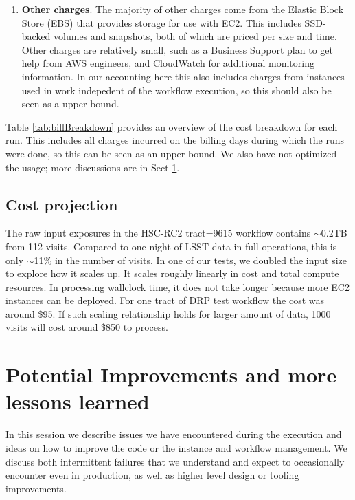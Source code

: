 \begin{enumerate}
\item \textbf{Other charges}.
The majority of other charges come from the Elastic Block Store (EBS) that provides storage for use with EC2.
This includes SSD-backed volumes and snapshots, both of which are priced per size and time.
Other charges are relatively small, such as a Business Support plan to get help from AWS engineers, and CloudWatch for additional monitoring information.
In our accounting here this also includes charges from instances used in work indepedent of the workflow execution, so this should also be seen as a upper bound.

\end{enumerate}

Table \ref{tab:billBreakdown} provides an overview of the cost breakdown for each run.
This includes all charges incurred on the billing days during which the runs were done, so this can be seen as an upper bound.
We also have not optimized the usage; more discussions are in Sect \ref{future}.



\subsection{Cost projection}

The raw input exposures in the HSC-RC2 tract=9615 workflow contains $\sim$0.2TB from 112 visits.
Compared to one night of LSST data in full operations, this is only $\sim$11\% in the number of visits.
In one of our tests, we doubled the input size to explore how it scales up.
It scales roughly linearly in cost and total compute resources.
In processing wallclock time, it does not take longer because more EC2 instances can be deployed.
For one tract of DRP test workflow the cost was around \$95.
If such scaling relationship holds for larger amount of data, 1000 visits will cost around \$850 to process.


\section{Potential Improvements and more lessons learned} \label{future}

In this session we describe issues we have encountered during the execution and ideas on how to improve the code or the instance and workflow management.
We discuss both intermittent failures that we understand and expect to occasionally encounter even in production, as well as higher level design or tooling improvements.

